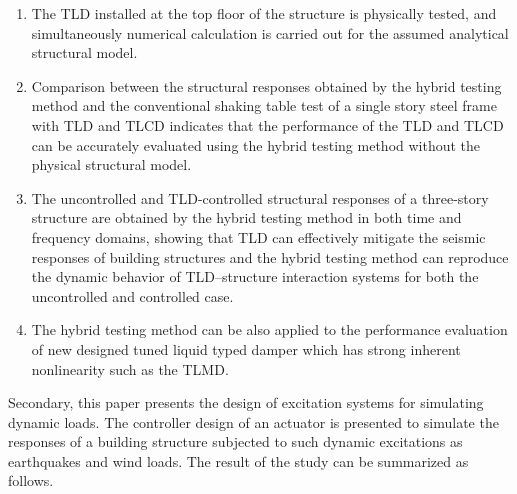 \begin{enumerate}
\item The TLD installed at the top floor of the structure is physically tested, and simultaneously numerical calculation is carried out for the assumed analytical structural model.
\item Comparison between the structural responses obtained by the hybrid testing method and the conventional shaking table test of a single story steel frame with TLD and TLCD indicates that the performance of the TLD and TLCD can be accurately evaluated using the hybrid testing method without the physical structural model.
\item The uncontrolled and TLD-controlled structural responses of a three-story structure are obtained by the hybrid testing method in both time and frequency domains, showing that TLD can effectively mitigate the seismic responses of building structures and the hybrid testing method can reproduce the dynamic behavior of TLD–structure interaction systems for both the uncontrolled and controlled case.
\item The hybrid testing method can be also applied to the performance evaluation of new designed tuned liquid typed damper which has strong inherent nonlinearity such as the TLMD.
\end{enumerate}

Secondary, this paper presents the design of excitation systems for simulating dynamic loads. The controller design of an actuator is presented to simulate the responses of a building structure subjected to such dynamic excitations as earthquakes and wind loads. The result of the study can be summarized as follows.  

